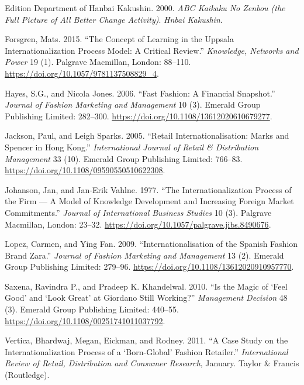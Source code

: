 \documentclass[hyperref, a4paper]{ctexart}
\begin{document}
\leavevmode\hypertarget{ref-innovative3}{}%
Edition Department of Hanbai Kakushin. 2000. \emph{ABC Kaikaku No Zenbou
(the Full Picture of All Better Change Activity)}. \emph{Hnbai
Kakushin}.

\leavevmode\hypertarget{ref-innovative11}{}%
Forsgren, Mats. 2015. ``The Concept of Learning in the Uppsala
Internationalization Process Model: A Critical Review.''
\emph{Knowledge, Networks and Power} 19 (1). Palgrave Macmillan, London:
88--110. \url{https://doi.org/10.1057/9781137508829_4}.

\leavevmode\hypertarget{ref-innovative12}{}%
Hayes, S.G., and Nicola Jones. 2006. ``Fast Fashion: A Financial
Snapshot.'' \emph{Journal of Fashion Marketing and Management} 10 (3).
Emerald Group Publishing Limited: 282--300.
\url{https://doi.org/10.1108/13612020610679277}.

\leavevmode\hypertarget{ref-innovative13}{}%
Jackson, Paul, and Leigh Sparks. 2005. ``Retail Internationalisation:
Marks and Spencer in Hong Kong.'' \emph{International Journal of Retail
\& Distribution Management} 33 (10). Emerald Group Publishing Limited:
766--83. \url{https://doi.org/10.1108/09590550510622308}.

\leavevmode\hypertarget{ref-innovative14}{}%
Johanson, Jan, and Jan-Erik Vahlne. 1977. ``The Internationalization
Process of the Firm --- A Model of Knowledge Development and Increasing
Foreign Market Commitments.'' \emph{Journal of International Business
Studies} 10 (3). Palgrave Macmillan, London: 23--32.
\url{https://doi.org/10.1057/palgrave.jibs.8490676}.

\leavevmode\hypertarget{ref-innovative16}{}%
Lopez, Carmen, and Ying Fan. 2009. ``Internationalisation of the Spanish
Fashion Brand Zara.'' \emph{Journal of Fashion Marketing and Management}
13 (2). Emerald Group Publishing Limited: 279--96.
\url{https://doi.org/10.1108/13612020910957770}.

\leavevmode\hypertarget{ref-innovative15}{}%
Saxena, Ravindra P., and Pradeep K. Khandelwal. 2010. ``Is the Magic of
`Feel Good' and `Look Great' at Giordano Still Working?''
\emph{Management Decision} 48 (3). Emerald Group Publishing Limited:
440--55. \url{https://doi.org/10.1108/00251741011037792}.

\leavevmode\hypertarget{ref-innovative6}{}%
Vertica, Bhardwaj, Megan, Eickman, and Rodney. 2011. ``A Case Study on
the Internationalization Process of a `Born-Global' Fashion Retailer.''
\emph{International Review of Retail, Distribution and Consumer
Research}, January. Taylor \& Francis (Routledge).
\end{document}
